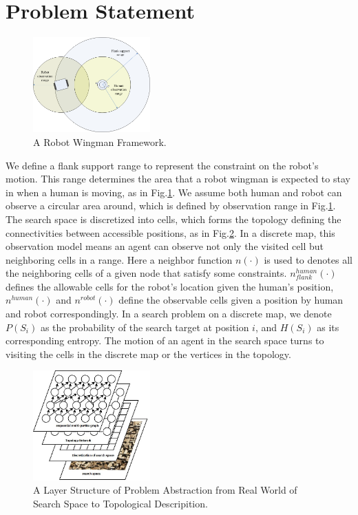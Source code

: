 \documentclass[12pt]{article}
\begin{document}
\section{Problem Statement}

\begin{figure}[htbp]
\centering
\includegraphics[width=0.4\textwidth]{./images/Wingman}
\caption{A Robot Wingman Framework.}
\label{fig:Wingman}
\end{figure}

We define a flank support range to represent the constraint on the robot's motion. This range determines the area that a robot wingman is expected to stay in when a human is moving, as in Fig.\ref{fig:Wingman}. We assume both human and robot can observe a circular area around, which is defined by observation range in Fig.\ref{fig:Wingman}. The search space is discretized into cells, which forms the topology defining the connectivities between accessible positions, as in Fig.\ref{fig:LayerStructure}. In a discrete map, this observation model means an agent can observe not only the visited cell but neighboring cells in a range. Here a neighbor function $ n(\cdot) $ is used to denotes all the neighboring cells of a given node that satisfy some constraints. $ n_{flank}^{human}(\cdot) $ defines the allowable cells for the robot's location given the human's position, $ n^{human}(\cdot) $  and $ n^{robot}(\cdot) $ define the observable cells given a position by human and robot correspondingly. In a search problem on a discrete map, we denote $ P(S_{i}) $ as the probability of the search target at position $ i $, and $ H(S_{i}) $ as its corresponding entropy. The motion of an agent in the search space turns to visiting the cells in the discrete map or the vertices in the topology. 


\begin{figure}[htbp]
\centering
\includegraphics[width=0.4\textwidth]{./images/LayerStructure}
\caption{A Layer Structure of Problem Abstraction from Real World of Search Space to Topological Descripition.}
\label{fig:LayerStructure}
\end{figure}
\end{document}
